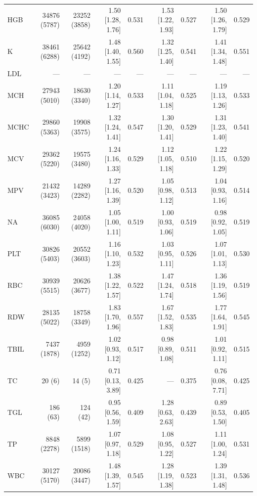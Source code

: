 \begin{table}[ht]
\begin{tabular}{lrrrrrrrr}
HGB & 34876 (5787) & 23252 (3858) & 1.50 [1.28, 1.76] & 0.531 & 1.53 [1.22, 1.93] & 0.527 & 1.50 [1.26, 1.79] & 0.529 \\
K & 38461 (6288) & 25642 (4192) & 1.48 [1.40, 1.55] & 0.560 & 1.32 [1.25, 1.40] & 0.541 & 1.41 [1.34, 1.48] & 0.551 \\
LDL & --- & --- & --- & --- & --- & --- & --- & --- \\
MCH & 27943 (5010) & 18630 (3340) & 1.20 [1.14, 1.27] & 0.533 & 1.11 [1.04, 1.18] & 0.525 & 1.19 [1.13, 1.26] & 0.533 \\
MCHC & 29860 (5363) & 19908 (3575) & 1.32 [1.24, 1.41] & 0.547 & 1.30 [1.20, 1.41] & 0.529 & 1.31 [1.23, 1.40] & 0.541 \\
MCV & 29362 (5220) & 19575 (3480) & 1.24 [1.16, 1.33] & 0.529 & 1.12 [1.05, 1.18] & 0.510 & 1.22 [1.15, 1.29] & 0.520 \\
MPV & 21432 (3423) & 14289 (2282) & 1.27 [1.16, 1.39] & 0.520 & 1.05 [0.98, 1.12] & 0.513 & 1.04 [0.93, 1.16] & 0.514 \\
NA & 36085 (6030) & 24058 (4020) & 1.05 [1.00, 1.11] & 0.519 & 1.00 [0.93, 1.06] & 0.519 & 0.98 [0.92, 1.05] & 0.519 \\
PLT & 30826 (5403) & 20552 (3603) & 1.16 [1.10, 1.23] & 0.532 & 1.03 [0.95, 1.11] & 0.526 & 1.07 [1.01, 1.13] & 0.530 \\
RBC & 30939 (5515) & 20626 (3677) & 1.38 [1.22, 1.57] & 0.522 & 1.47 [1.24, 1.74] & 0.518 & 1.36 [1.19, 1.56] & 0.519 \\
RDW & 28135 (5022) & 18758 (3349) & 1.83 [1.70, 1.96] & 0.557 & 1.67 [1.52, 1.83] & 0.535 & 1.77 [1.64, 1.91] & 0.545 \\
TBIL & 7437 (1878) & 4959 (1252) & 1.02 [0.93, 1.12] & 0.517 & 0.98 [0.89, 1.08] & 0.511 & 1.01 [0.92, 1.11] & 0.515 \\
TC & 20 (6) & 14 (5) & 0.71 [0.13, 3.89] & 0.425 & --- & 0.375 & 0.76 [0.08, 7.71] & 0.425 \\
TGL & 186 (63) & 124 (42) & 0.95 [0.56, 1.59] & 0.409 & 1.28 [0.63, 2.63] & 0.439 & 0.89 [0.53, 1.50] & 0.405 \\
TP & 8848 (2278) & 5899 (1518) & 1.07 [0.97, 1.18] & 0.529 & 1.08 [0.95, 1.22] & 0.527 & 1.11 [1.00, 1.24] & 0.531 \\
WBC & 30127 (5170) & 20086 (3447) & 1.48 [1.39, 1.57] & 0.545 & 1.28 [1.19, 1.38] & 0.523 & 1.39 [1.31, 1.48] & 0.536 \\
\bottomrule
\end{tabular}
\label{tab:eicu_cox_sepsis}
\end{table}
